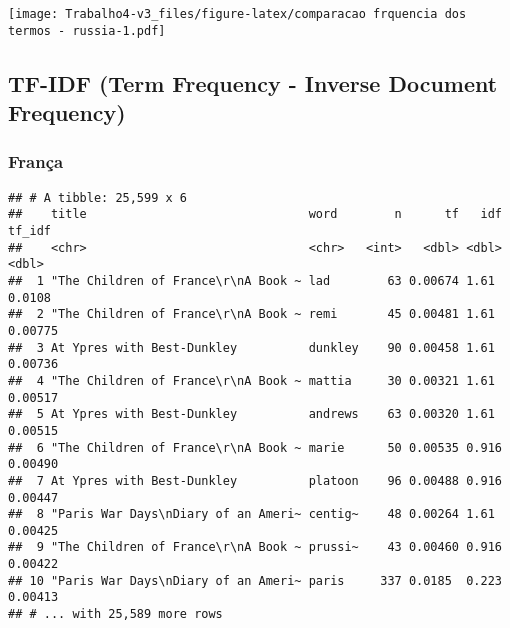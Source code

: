 \documentclass[]{article}
\newenvironment{Shaded}{\begin{snugshade}}{\end{snugshade}}
\newcommand{\KeywordTok}[1]{\textcolor[rgb]{0.13,0.29,0.53}{\textbf{#1}}}
\newcommand{\NormalTok}[1]{#1}
\newcommand{\OperatorTok}[1]{\textcolor[rgb]{0.81,0.36,0.00}{\textbf{#1}}}
\newcommand{\StringTok}[1]{\textcolor[rgb]{0.31,0.60,0.02}{#1}}
\begin{document}
\texttt{[image: Trabalho4-v3\_files/figure-latex/comparacao frquencia dos termos - russia-1.pdf]}

\hypertarget{tf-idf-term-frequency---inverse-document-frequency}{%
\subsection{TF-IDF (Term Frequency - Inverse Document
Frequency)}\label{tf-idf-term-frequency---inverse-document-frequency}}

\hypertarget{franca-2}{%
\subsubsection{França}\label{franca-2}}

\begin{Shaded}
\end{Shaded}

\begin{verbatim}
## # A tibble: 25,599 x 6
##    title                               word        n      tf   idf  tf_idf
##    <chr>                               <chr>   <int>   <dbl> <dbl>   <dbl>
##  1 "The Children of France\r\nA Book ~ lad        63 0.00674 1.61  0.0108 
##  2 "The Children of France\r\nA Book ~ remi       45 0.00481 1.61  0.00775
##  3 At Ypres with Best-Dunkley          dunkley    90 0.00458 1.61  0.00736
##  4 "The Children of France\r\nA Book ~ mattia     30 0.00321 1.61  0.00517
##  5 At Ypres with Best-Dunkley          andrews    63 0.00320 1.61  0.00515
##  6 "The Children of France\r\nA Book ~ marie      50 0.00535 0.916 0.00490
##  7 At Ypres with Best-Dunkley          platoon    96 0.00488 0.916 0.00447
##  8 "Paris War Days\nDiary of an Ameri~ centig~    48 0.00264 1.61  0.00425
##  9 "The Children of France\r\nA Book ~ prussi~    43 0.00460 0.916 0.00422
## 10 "Paris War Days\nDiary of an Ameri~ paris     337 0.0185  0.223 0.00413
## # ... with 25,589 more rows
\end{verbatim}
\end{document}
